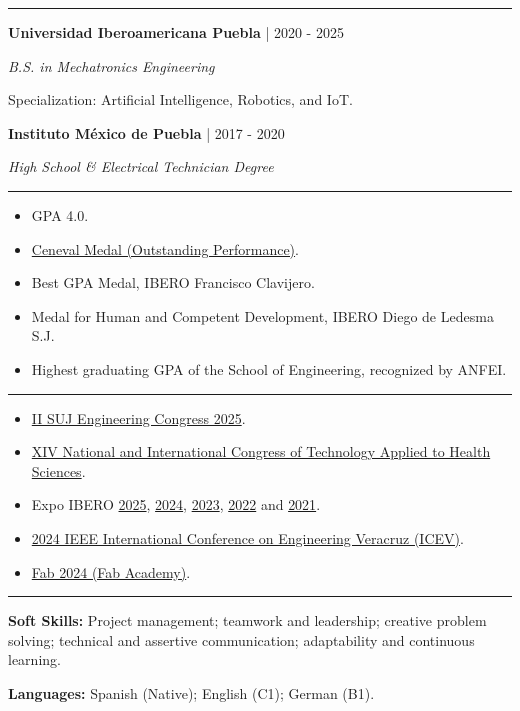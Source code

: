 \documentclass[10pt,letterpaper]{article}
\newcommand{\sectionline}{\vspace{-2pt}\textcolor{accent}{\rule{\linewidth}{0.8pt}}\vspace{1pt}}
\newcommand{\cvsection}[1]{\vspace{5pt}{\large\bfseries\textcolor{navy}{#1}}\par\sectionline}
\newcommand{\entry}[3]{\textbf{#1} \textcolor{muted}{| #2}\par\textit{#3}\par}
\newcommand{\eventlink}[2]{\href{#1}{#2}}
\begin{document}
\cvsection{Education}
\entry{Universidad Iberoamericana Puebla}{2020 - 2025}{B.S. in Mechatronics Engineering}
Specialization: Artificial Intelligence, Robotics, and IoT.

\entry{Instituto M\'{e}xico de Puebla}{2017 - 2020}{High School \& Electrical Technician Degree}

\cvsection{Awards \& Honors}
\begin{itemize}
  \item GPA 4.0.
  \item \href{https://jphajp.github.io/JPHAJP/Web/assets/docs/cenaval.pdf}{Ceneval Medal (Outstanding Performance)}.
  \item Best GPA Medal, IBERO Francisco Clavijero.
  \item Medal for Human and Competent Development, IBERO Diego de Ledesma S.J.
  \item Highest graduating GPA of the School of Engineering, recognized by ANFEI.
\end{itemize}

\cvsection{Selected Presentations}
\begin{itemize}
  \item \eventlink{https://congresossuj.mx/}{II SUJ Engineering Congress 2025}.
  \item \eventlink{https://www-optica.inaoep.mx/\string~tecnologia_salud/2024/programa.php}{XIV National and International Congress of Technology Applied to Health Sciences}.
  \item Expo IBERO \eventlink{https://www.linkedin.com/posts/jphajp_robot-articulado-y-m\%C3\%B3vil-activity-7353272381097869313-Io7Q}{2025}, \eventlink{https://github.com/JPHAJP/Raspberry/tree/main/Interfaces/ProyectoUI}{2024}, \eventlink{https://repositorio.iberopuebla.mx/handle/20.500.11777/5915}{2023}, \eventlink{https://repositorio.iberopuebla.mx/handle/20.500.11777/5221}{2022} and \eventlink{https://www.linkedin.com/posts/jphajp_prototipo-de-regadera-con-temporizador-para-activity-7160025958538743809-kdxj}{2021}.
  \item \eventlink{https://ieeexplore.ieee.org/document/10765997}{2024 IEEE International Conference on Engineering Veracruz (ICEV)}.
  \item \eventlink{https://fabacademy.org/}{Fab 2024 (Fab Academy)}.
\end{itemize}

\cvsection{Soft Skills \& Languages}
\textbf{Soft Skills:} Project management; teamwork and leadership; creative problem solving; technical and assertive communication; adaptability and continuous learning.\par
\textbf{Languages:} Spanish (Native); English (C1); German (B1).
\end{document}
